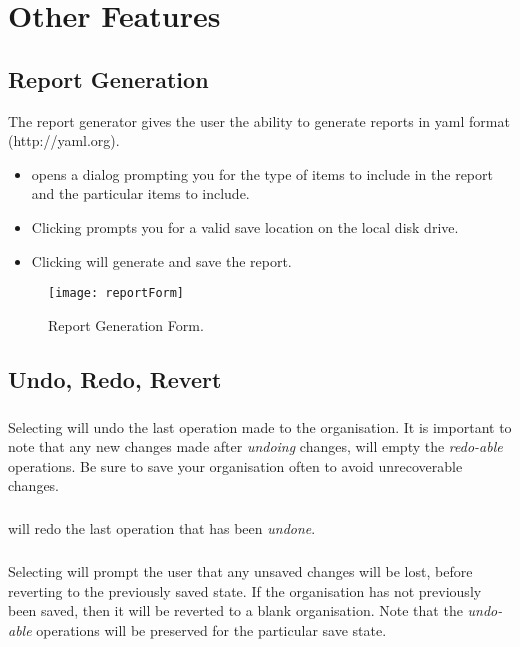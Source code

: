 \documentclass[11pt,fleqn]{book} %
\begin{document}
\chapter{Other Features}
\section{Report Generation}
The report generator gives the user the ability to generate reports in yaml format (http://yaml.org).
\begin{itemize}
  \item {} opens a dialog prompting you for the type of items to include in the report and the particular items to include.
  \item Clicking  prompts you for a valid save location on the local disk drive.
  \item Clicking  will generate and save the report.
\end{itemize}

\begin{figure}[H]
  \centering
  \texttt{[image: reportForm]}
  \caption{Report Generation Form.\label{reportForm}}
\end{figure}

\section{Undo, Redo, Revert}
\paragraph{}
Selecting  will undo the last operation made to the organisation. It is important to note that any
new changes made after \textit{undoing} changes, will empty the
\textit{redo-able} operations. Be sure to save your organisation often to avoid
unrecoverable changes.

\paragraph{}
 will redo the last operation that has been \textit{undone}.

\paragraph{}
Selecting  will prompt the user that any unsaved changes will be lost, before reverting
to the previously saved state. If the organisation has not previously been saved, then it will be reverted
to a blank organisation. Note that the \textit{undo-able} operations will be preserved for the particular save state.
\end{document}
